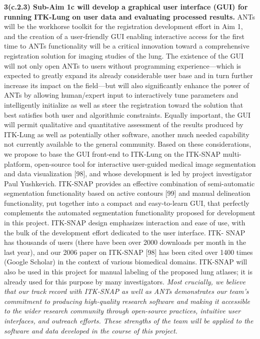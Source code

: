 \documentclass[11pt,]{article}
\begin{document}
\textbf{3(c.2.3) Sub-Aim 1c will develop a graphical user interface
(GUI) for running ITK-Lung on user data and evaluating processed
results.} ANTs will be the workhorse toolkit for the registration
development effort in Aim 1, and the creation of a user-friendly GUI
enabling interactive access for the first time to ANTs functionality
will be a critical innovation toward a comprehensive registration
solution for imaging studies of the lung. The existence of the GUI will
not only open ANTs to users without programming experience---which is
expected to greatly expand its already considerable user base and in
turn further increase its impact on the field---but will also
significantly enhance the power of ANTs by allowing human/expert input
to interactively tune parameters and intelligently initialize as well as
steer the registration toward the solution that best satisfies both user
and algorithmic constraints. Equally important, the GUI will permit
qualitative and quantitative assessment of the results produced by
ITK-Lung as well as potentially other software, another much needed
capability not currently available to the general community. Based on
these considerations, we propose to base the GUI front-end to ITK-Lung
on the ITK-SNAP multi-platform, open-source tool for interactive
user-guided medical image segmentation and data visualization {[}98{]},
and whose development is led by project investigator Paul Yushkevich.
ITK-SNAP provides an effective combination of semi-automatic
segmentation functionality based on active contours {[}99{]} and manual
delineation functionality, put together into a compact and easy-to-learn
GUI, that perfectly complements the automated segmentation functionality
proposed for development in this project. ITK-SNAP design emphasizes
interaction and ease of use, with the bulk of the development effort
dedicated to the user interface. ITK- SNAP has thousands of users (there
have been over 2000 downloads per month in the last year), and our 2006
paper on ITK-SNAP {[}98{]} has been cited over 1400 times (Google
Scholar) in the context of various biomedical domains. ITK-SNAP will
also be used in this project for manual labeling of the proposed lung
atlases; it is already used for this purpose by many investigators.
\emph{Most crucially, we believe that our track record with ITK-SNAP as
well as ANTs demonstrates our team's commitment to producing
high-quality research software and making it accessible to the wider
research community through open-source practices, intuitive user
interfaces, and outreach efforts. These strengths of the team will be
applied to the software and data developed in the course of this
project.}
\end{document}
